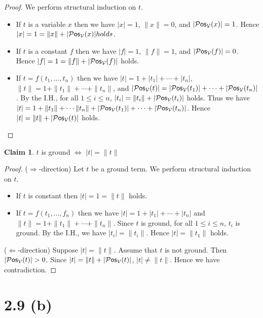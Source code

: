 \documentclass[autodetect-engine]{article}
\newcommand{\VV}{\mathcal{V}}
\theoremstyle{plain}
\theoremstyle{definition}
\theoremstyle{definition}
\newtheorem*{claim}{Claim}
\begin{document}
\begin{proof}
    We perform structural induction on $t$.
    \begin{itemize}
        \item If $t$ is a variable $x$ then we have $|x| = 1$, $\|x\| = 0$, and $|\Pos_\VV(x)| = 1$.
            Hence $|x| = 1 = \|x\| + |\Pos_\VV(x)| holds$.
        \item If $t$ is a constant $f$ then we have $|f| = 1$, $\|f\| = 1$, and $|\Pos_\VV(f)| = 0$.
            Hence $|f| = 1 = \|f\| + |\Pos_\VV(f)|$ holds.
        \item If $t = f(t_1,\dots,t_n)$ then we have $|t| = 1 + |t_1| + \cdots + |t_n|$,
            $\|t\| = 1 + \|t_1\| + \cdots + \|t_n\|$, and $|\Pos_\VV(t)| = |\Pos_\VV(t_1)| + \cdots + |\Pos_\VV(t_n)|$.
            By the I.H., for all $1 \leq i \leq n$, $|t_i| = \|t_i\| + |\Pos_\VV(t_i)|$ holds.
            Thus we have $|t| = 1 + \|t_1\| + \cdots \|t_n\| + |\Pos_\VV(t_1)| + \cdots + |\Pos_\VV(t_n)|$.
            Hence $|t| = \|t\| +|\Pos_\VV(t)|$ holds. 
    \end{itemize}
\end{proof}

\begin{claim}
    $t$ is ground $\Leftrightarrow$ $|t| = \|t\|$
\end{claim}

\begin{proof}
    ($\Rightarrow$-direction) Let $t$ be a ground term.
    We perform structural induction on $t$.
    \begin{itemize}
        \item If $t$ is constant then $|t| = 1 = \|t\|$ holds.
        \item If $t = f(t_1,\dots,f_n)$ then we have $|t| = 1 + |t_1| + \cdots + |t_n|$ and $\|t\| = 1 + \|t_1\| + \cdots + \|t_n\|$.
        Since $t$ is ground, for all $1 \leq i \leq n$, $t_i$ is ground.
        By the I.H., we have $|t_i| = \|t_i\|$.
        Hence $|t| = \|t_1\|$ holds.
    \end{itemize}

    ($\Leftarrow$-direction)
    Suppose $|t| = \|t\|$.
    Assume that $t$ is not ground.
    Then $|\Pos_\VV(t)| > 0$.
    Since $|t| = \|t\| + |\Pos_\VV(t)|$, $|t| \neq \|t\|$.
    Hence we have contradiction.
\end{proof}



\section*{2.9 (b)}
\end{document}
